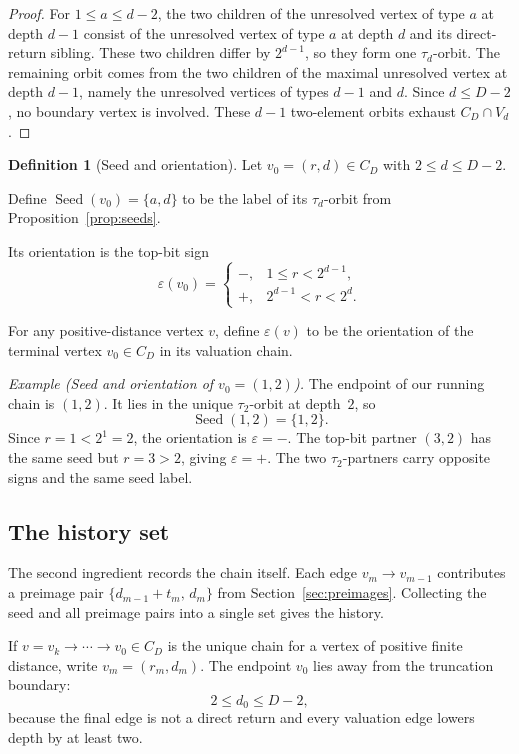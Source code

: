 \documentclass[11pt]{amsart}
\theoremstyle{definition}
\newtheorem{definition}[theorem]{Definition}
\theoremstyle{remark}
\newcommand{\Seed}{\operatorname{Seed}}
\newcommand{\eps}{\varepsilon}
\begin{document}
\begin{proof}
For $1\le a\le d-2$, the two children of the unresolved vertex of
type $a$ at depth $d-1$ consist of the unresolved vertex of type $a$
at depth $d$ and its direct-return sibling.  These two children differ
by $2^{d-1}$, so they form one $\tau_d$-orbit.  The remaining orbit
comes from the two children of the maximal unresolved vertex at depth
$d-1$, namely the unresolved vertices of types $d-1$ and $d$.  Since
$d\le D-2$, no boundary vertex is involved.  These $d-1$ two-element
orbits exhaust $C_D\cap V_d$.
\end{proof}

\begin{definition}[Seed and orientation]\label{def:orientation}
Let $v_0=(r,d)\in C_D$ with $2\le d\le D-2$.  

Define
\(
\Seed(v_0)=\{a,d\}
\)
to be the label of its $\tau_d$-orbit from Proposition~\ref{prop:seeds}.

Its orientation is the top-bit sign
\[
\eps(v_0)=
\begin{cases}
-,&1\le r<2^{d-1},\\
+,&2^{d-1}<r<2^d.
\end{cases}
\]

For any positive-distance vertex $v$, define $\eps(v)$ to be the
orientation of the terminal vertex $v_0\in C_D$ in its valuation
chain.
\end{definition}

\textit{Example (Seed and orientation of $v_0=(1,2)$).}
The endpoint of our running chain is $(1,2)$.  It lies in the unique
$\tau_2$-orbit at depth~$2$, so
\[
  \Seed(1,2)=\{1,2\}.
\]
Since $r=1<2^1=2$, the orientation is $\eps=-$.  The top-bit partner
$(3,2)$ has the same seed but $r=3>2$, giving $\eps=+$.  The two
$\tau_2$-partners carry opposite signs and the same seed label.

\subsection{The history set}\label{subsec:general-history}

The second ingredient records the chain itself.  Each edge
$v_m\to v_{m-1}$ contributes a preimage pair
$\{d_{m-1}+t_m,\,d_m\}$ from Section~\ref{sec:preimages}.
Collecting the seed and all preimage pairs into a single set gives the
history.

If $v=v_k\to\cdots\to v_0\in C_D$ is the unique chain for a vertex
of positive finite distance, write $v_m=(r_m,d_m)$. The endpoint $v_0$ lies away
from the truncation boundary:
\[
2\le d_0\le D-2,
\]
because the final edge is not a direct return and every valuation edge
lowers depth by at least two. 
\end{document}
